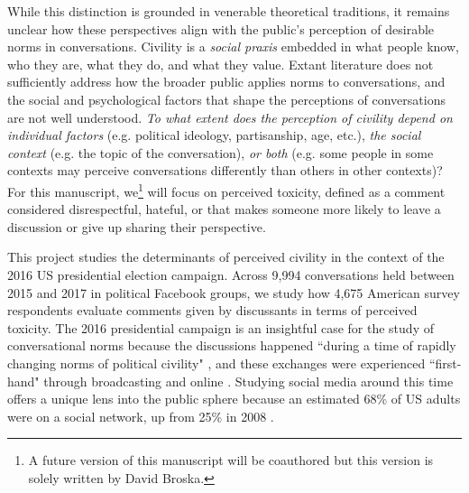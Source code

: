 \documentclass{article}
\begin{document}
While this distinction is grounded in venerable theoretical traditions, it remains unclear how these perspectives align with the public's perception of desirable norms in conversations. Civility is a \textit{social praxis} embedded in what people know, who they are, what they do, and what they value. Extant literature does not sufficiently address how the broader public applies norms to conversations, and the social and psychological factors that shape the perceptions of conversations are not well understood. \textit{To what extent does the perception of civility depend on individual factors} (e.g. political ideology, partisanship, age, etc.), \textit{the social context} (e.g. the topic of the conversation), \textit{or both} (e.g. some people in some contexts may perceive conversations differently than others in other contexts)? For this manuscript, we\footnote{A future version of this manuscript will be coauthored but this version is solely written by David Broska.} will focus on perceived toxicity, defined as a comment considered disrespectful, hateful, or that makes someone more likely to leave a discussion or give up sharing their perspective. 

This project studies the determinants of perceived civility in the context of the 2016 US presidential election campaign. Across 9,994 conversations held between 2015 and 2017 in political Facebook groups, we study how 4,675 American survey respondents evaluate comments given by discussants in terms of perceived toxicity. The 2016 presidential campaign is an insightful case for the study of conversational norms because the discussions happened ``during a time of rapidly changing norms of political civility" \citep{munger_dont_2021}, and these exchanges were experienced ``first-hand" through broadcasting and online \citep{mutz_inyourface_2016}. Studying social media around this time offers a unique lens into the public sphere because an estimated 68\% of US adults were on a social network, up from 25\% in 2008 \citep{duggan_social_2016}.

\end{document}
